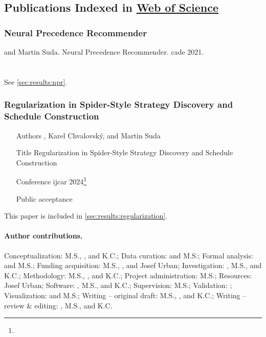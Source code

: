 \subsection{Publications Indexed in \href{https://www.webofscience.com/}{Web of Science}}
\label{sec:wos}

\subsubsection{Neural Precedence Recommender}

 and Martin Suda.
Neural Precedence Recommender.
\Acrfull{cade} 2021.
\cite{DBLP:conf/cade/Bartek021}
\\ 
\\ 
\\ See \cref{sec:results:npr}.

\subsubsection{Regularization in Spider-Style Strategy Discovery and Schedule Construction}


\begin{itemize}
\item[Authors] , Karel Chvalovský, and Martin Suda
\item[Title] Regularization in Spider-Style Strategy Discovery and Schedule Construction \cite{DBLP:conf/ijcar/BartekCS24}
\item[Conference] \Acrfull{ijcar} 2024\footnote{}
\item[Public acceptance] 
\end{itemize}

This paper is included in \cref{sec:results:regularization}.

\paragraph{Author contributions.}
Conceptualization: M.S., , and K.C.;
Data curation:  and M.S.;
Formal analysis:  and M.S.;
Funding acquisition: M.S., , and Josef Urban;
Investigation: , M.S., and K.C.;
Methodology: M.S., , and K.C.;
Project administration: M.S.;
Resources: Josef Urban;
Software: , M.S., and K.C.;
Supervision: M.S.;
Validation: ;
Visualization:  and M.S.;
Writing -- original draft: M.S., , and K.C.;
Writing -- review \& editing: , M.S., and K.C.

